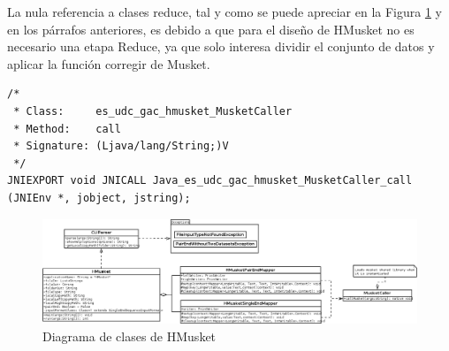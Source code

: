 \documentclass[conference]{IEEEtran}
\begin{document}
La nula referencia a clases reduce, tal y como se puede apreciar en la Figura \ref{class_diagram} y en los párrafos anteriores, es debido a que para el diseño de HMusket no es necesario una etapa Reduce, ya que solo interesa dividir el conjunto de datos y aplicar la función corregir de Musket.

\begin{lstlisting}[style=CStyle, caption=Cabecera JNI generada]
/*
 * Class:     es_udc_gac_hmusket_MusketCaller
 * Method:    call
 * Signature: (Ljava/lang/String;)V
 */
JNIEXPORT void JNICALL Java_es_udc_gac_hmusket_MusketCaller_call (JNIEnv *, jobject, jstring);
\end{lstlisting}

\begin{figure}
	\includegraphics[width=\textwidth]{figures/hmusket.png}
	\caption{Diagrama de clases de HMusket}
	\label{class_diagram}
\end{figure}
\end{document}
